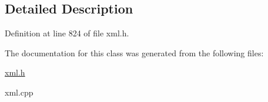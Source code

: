 \subsection{Detailed Description}


Definition at line 824 of file xml.h.



The documentation for this class was generated from the following files:\begin{DoxyCompactItemize}
\item 
\hyperlink{xml_8h}{xml.h}\item 
xml.cpp\end{DoxyCompactItemize}
